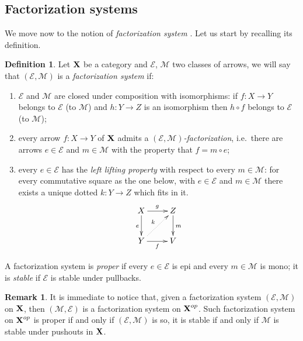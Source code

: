 \documentclass[a4paper]{article}
\def\X{\textbf {\textup{X}}}
\theoremstyle{definition}
\newtheorem{definition}[theorem]{Definition}
\newtheorem{remark}[theorem]{Remark}
\begin{document}
\subsection{Factorization systems}

We move now to the notion of \emph{factorization system} \cite{adamek2009abstract,bousfield1977constructions,kelly1991note,rosicky2007factorization,tholen1983factorizations}. Let us start by recalling its definition.

\begin{definition}\label{def:fs}
	Let $\X$ be a category and $\mathcal{E}$, $\mathcal{M}$ two classes of arrows, we will say that $(\mathcal{E},\mathcal{M})$ is a \emph{factorization system} if:
	\begin{enumerate}
		\item $\mathcal{E}$ and $\mathcal{M}$ are closed under composition with isomorphisms: if $f\colon X\to Y$ belongs to $\mathcal{E}$ (to $\mathcal{M}$) and $h\colon Y\to Z$ is an isomorphism then $h\circ f$ belongs to $\mathcal{E}$ (to $\mathcal{M}$);
		\item  every arrow $f\colon X\to Y$ of $\X$ admits a \emph{$(\mathcal{E}, \mathcal{M})$-factorization}, i.e.~there are arrows $e\in \mathcal{E}$ and $m\in \mathcal{M}$ with the property that $f=m\circ e$;
		\item every $e\in \mathcal{E}$ has the \emph{left lifting property} with respect to every $m\in \mathcal{M}$: for every commutative square as the one below, with $e\in \mathcal{E}$ and $m\in \mathcal{M}$ there exists a unique dotted $k\colon Y\rightarrow Z$ which fits in it.
		\[\xymatrix{X \ar[r]^g \ar[d]_{e}& Z \ar[d]^{m}\\ Y \ar[r]_{f} \ar@{.>}[ur]^{k}& V}\] 
	\end{enumerate}
	
	A factorization system is \emph{proper} if every $e\in \mathcal{E}$ is epi and every $m\in \mathcal{M}$ is mono; it is \emph{stable} if $\mathcal{E}$ is stable under pullbacks.
\end{definition}

\begin{remark}\label{rem:dual}It is immediate to notice that, given a factorization system $(\mathcal{E}, \mathcal{M})$ on $\X$, then $(\mathcal{M}, \mathcal{E})$ is a factorization system on $\X^{op}$. Such factorization system on $\X^{op}$ is proper if and only if $(\mathcal{E}, \mathcal{M})$ is so, it is stable if and only if $\mathcal{M}$ is stable under pushouts in $\X$.  
\end{remark}
\end{document}
